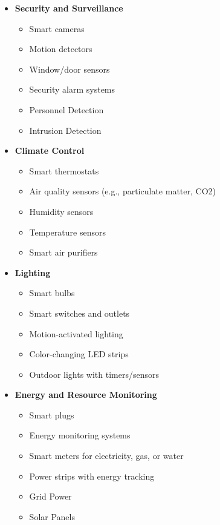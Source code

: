 \documentclass[10pt, journal]{IEEEtran} %
\begin{document}
\begin{itemize}[]  %
    \item{\textbf{Security and Surveillance}}
        \begin{itemize}
            \item Smart cameras
            \item Motion detectors
            \item Window/door sensors
            \item Security alarm systems
            \item Personnel Detection
            \item Intrusion Detection
        \end{itemize}

    \item{\textbf{Climate Control}}
        \begin{itemize}
            \item Smart thermostats
            \item Air quality sensors (e.g., particulate matter, CO2)
            \item Humidity sensors
            \item Temperature sensors
            \item Smart air purifiers
        \end{itemize}

    \item{\textbf{Lighting}}
        \begin{itemize}
            \item Smart bulbs
            \item Smart switches and outlets
            \item Motion-activated lighting
            \item Color-changing LED strips
            \item Outdoor lights with timers/sensors
        \end{itemize}

    \item{\textbf{Energy and Resource Monitoring}}
        \begin{itemize}
            \item Smart plugs
            \item Energy monitoring systems
            \item Smart meters for electricity, gas, or water
            \item Power strips with energy tracking
            \item Grid Power
            \item Solar Panels
        \end{itemize}


\end{itemize}
\end{document}

